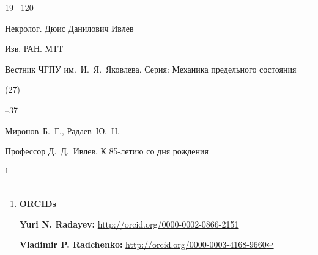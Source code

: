 \begin{thebibliography}{19}
--120





\paper Некролог. Дюис Данилович Ивлев 

\jour Изв. РАН. МТТ










\jour Вестник \mbox{ЧГПУ} им.~И.~Я.~Яковлева. Серия: Механика предельного состояния


(27)

–37

\by  Миронов~Б.~Г., Радаев~Ю.~Н.

\paper Профессор Д.~Д.~Ивлев. К 85-летию со дня рождения





\end{thebibliography}



\RuDate 



\bigskip



\makeentitle



\thanks{{\bf ORCIDs}



{\bf   	Yuri N. Radayev:}    \url{http://orcid.org/0000-0002-0866-2151}



{\bf Vladimir P. Radchenko:}    \url{http://orcid.org/0000-0003-4168-9660}







}





\EngRef



